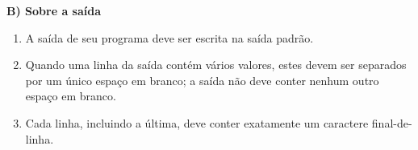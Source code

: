 \documentclass[11pt,oneside,a4paper]{book}
\begin{document}
\begin{titlepage}
\textbf{B) Sobre a saída}
\begin{enumerate}
\setlength{\itemsep}{0pt}
\setlength{\parskip}{0pt}
\setlength{\parsep}{0pt} 
\item A saída de seu programa deve ser escrita na saída padrão.
\item Quando uma linha da saída contém vários valores, estes devem ser separados por um único espaço em branco; a saída não deve conter nenhum outro espaço em branco.
\item Cada linha, incluindo a última, deve conter exatamente um caractere final-de-linha.
\end{enumerate}

\end{titlepage}











\end{document}
